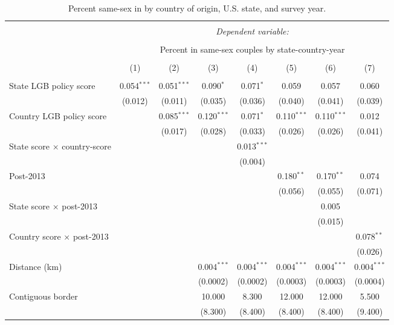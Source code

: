 \documentclass[
  11pt,
]{article}
\begin{document}
\begin{table}[H] \centering 
  \caption{Percent same-sex in by country of origin, U.S. state, and survey year.} 
  \label{tab:state-props-full} 
\footnotesize 
\begin{tabular}{@{\extracolsep{2pt}}lccccccc} 
\\[-1.8ex]\hline 
\hline \\[-1.8ex] 
 & \multicolumn{7}{c}{\textit{Dependent variable:}} \\ 
\cline{2-8} 
\\[-1.8ex] & \multicolumn{7}{c}{Percent in same-sex couples by state-country-year} \\ 
\\[-1.8ex] & (1) & (2) & (3) & (4) & (5) & (6) & (7)\\ 
\hline \\[-1.8ex] 
 State LGB policy score & 0.054$^{***}$ & 0.051$^{***}$ & 0.090$^{*}$ & 0.071$^{*}$ & 0.059 & 0.057 & 0.060 \\ 
  & (0.012) & (0.011) & (0.035) & (0.036) & (0.040) & (0.041) & (0.039) \\ 
  Country LGB policy score &  & 0.085$^{***}$ & 0.120$^{***}$ & 0.071$^{*}$ & 0.110$^{***}$ & 0.110$^{***}$ & 0.012 \\ 
  &  & (0.017) & (0.028) & (0.033) & (0.026) & (0.026) & (0.041) \\ 
  State score × country-score &  &  &  & 0.013$^{***}$ &  &  &  \\ 
  &  &  &  & (0.004) &  &  &  \\ 
  Post-2013 &  &  &  &  & 0.180$^{**}$ & 0.170$^{**}$ & 0.074 \\ 
  &  &  &  &  & (0.056) & (0.055) & (0.071) \\ 
  State score × post-2013 &  &  &  &  &  & 0.005 &  \\ 
  &  &  &  &  &  & (0.015) &  \\ 
  Country score × post-2013 &  &  &  &  &  &  & 0.078$^{**}$ \\ 
  &  &  &  &  &  &  & (0.026) \\ 
  Distance (km) &  &  & 0.004$^{***}$ & 0.004$^{***}$ & 0.004$^{***}$ & 0.004$^{***}$ & 0.004$^{***}$ \\ 
  &  &  & (0.0002) & (0.0002) & (0.0003) & (0.0003) & (0.0004) \\ 
  Contiguous border &  &  & 10.000 & 8.300 & 12.000 & 12.000 & 5.500 \\ 
  &  &  & (8.300) & (8.400) & (8.400) & (8.400) & (9.400) \\ 

\end{tabular}
\end{table}
\end{document}
